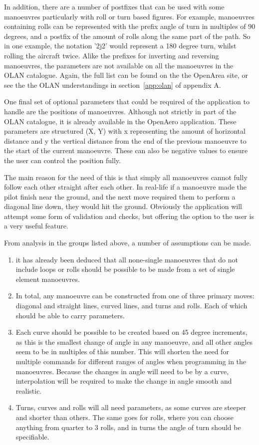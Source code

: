 In addition, there are a number of postfixes that can be used with some manoeuvres particularly with roll or turn based figures. For example, manoeuvres containing rolls can be represented with the prefix angle of turn in multiples of 90 degrees, and a postfix of the amount of rolls along the same part of the path. So in one example, the notation '2j2' would represent a 180 degree turn, whilst rolling the aircraft twice. Alike the prefixes for inverting and reversing manoeuvres, the parameters are not available on all the manoeuvres in the OLAN catalogue. Again, the full list can be found on the the OpenArea site, or see the the OLAN understandings in section~\ref{app:olan} of appendix A.

One final set of optional parameters that could be required of the application to handle are the positions of manoeuvres. Although not strictly in part of the OLAN catalogue, it is already available in the OpenAero application. These parameters are structured (X, Y) with x representing the amount of horizontal distance and y the vertical distance from the end of the previous manoeuvre to the start of the current manoeuvre. These can also be negative values to ensure the user can control the position fully. 

The main reason for the need of this is that simply all manoeuvres cannot fully follow each other straight after each other. In real-life if a manoeuvre made the pilot finish near the ground, and the next move required them to perform a diagonal line down, they would hit the ground. Obviously the application will attempt some form of validation and checks, but offering the option to the user is a very useful feature.

From analysis in the groups listed above, a number of assumptions can be made.
\begin{enumerate}
	\item it has already been deduced that all none-single manoeuvres that do not include loops or rolls should be possible to be made from a set of single element manoeuvres.
	\item In total, any manoeuvre can be constructed from one of three primary moves: diagonal and straight lines, curved lines, and turns and rolls. Each of which should be able to carry parameters.
	\item Each curve should be possible to be created based on 45 degree increments, as this is the smallest change of angle in any manoeuvre, and all other angles seem to be in multiples of this number. This will shorten the need for multiple commands for different ranges of angles when programming in the manoeuvres. Because the changes in angle will need to be by a curve, interpolation will be required to make the change in angle smooth and realistic.
	\item Turns, curves and rolls will all need parameters, as some curves are steeper and shorter than others. The same goes for rolls, where you can choose anything from quarter to 3 rolls, and in turns the angle of turn should be specifiable.
\end{enumerate}

